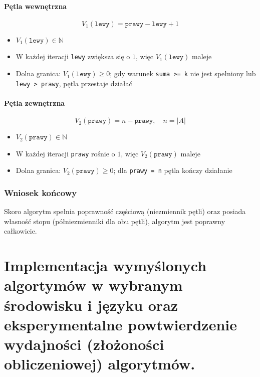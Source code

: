 \documentclass{article}
\begin{document}
\paragraph{Pętla wewnętrzna}
\[
V_1(\texttt{lewy}) = \texttt{prawy} - \texttt{lewy} + 1
\]
\begin{itemize}
    \item $V_1(\texttt{lewy}) \in \mathbb{N}$
    \item W każdej iteracji \texttt{lewy} zwiększa się o $1$, więc $V_1(\texttt{lewy})$ maleje
    \item Dolna granica: $V_1(\texttt{lewy}) \ge 0$; gdy warunek \texttt{suma >= k} nie jest spełniony lub \texttt{lewy > prawy}, pętla przestaje działać
\end{itemize}

\paragraph{Pętla zewnętrzna}
\[
V_2(\texttt{prawy}) = n - \texttt{prawy}, \quad n = |A|
\]
\begin{itemize}
    \item $V_2(\texttt{prawy}) \in \mathbb{N}$
    \item W każdej iteracji \texttt{prawy} rośnie o $1$, więc $V_2(\texttt{prawy})$ maleje
    \item Dolna granica: $V_2(\texttt{prawy}) \ge 0$; dla \texttt{prawy = n} pętla kończy działanie
\end{itemize}

\subsubsection{Wniosek końcowy}
Skoro algorytm spełnia poprawność częściową (niezmiennik pętli) oraz posiada własność stopu (półniezmienniki dla obu pętli), algorytm jest poprawny całkowicie.

\section{Implementacja wymyślonych algortymów w wybranym środowisku i języku oraz
eksperymentalne powtwierdzenie wydajności (złożoności obliczeniowej) algorytmów.}
\end{document}
